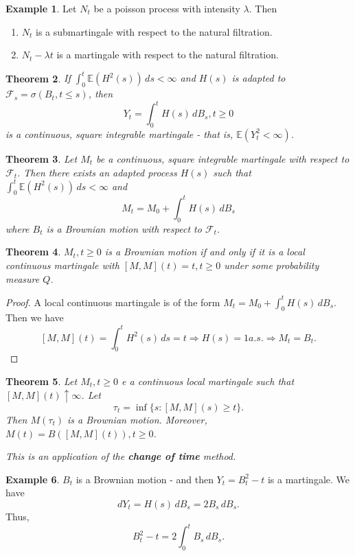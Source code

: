 \documentclass[10pt, oneside, reqno]{amsart}
\theoremstyle{plain}%
\newtheorem{thm}{Theorem}[section]
\theoremstyle{definition}
\newtheorem{exmp}[thm]{Example}
\theoremstyle{remark}
\newcommand{\E}{\mathbb{E}}
\newcommand{\sigf}{\mathcal{F}}
\begin{document}
\begin{exmp}
    Let $N_t$ be a poisson process with intensity $\lambda$.  Then 
    \begin{enumerate}
        \item $N_t$ is a submartingale with respect to the natural filtration.
        \item $N_t - \lambda t$ is a martingale with respect to the natural filtration.  
    \end{enumerate}
\end{exmp}

\begin{thm}
    If $\int_0^t \E(H^2(s)) \, ds < \infty$ and $H(s)$ is adapted to $\sigf_s = \sigma( B_t, t \leq s)$, then \[ Y_t = \int_0^t H(s) \, dB_s, t \geq 0
    \]  is a continuous, square integrable martingale - that is, $\E(Y_t^2 < \infty)$.
\end{thm}

\begin{thm}
    Let $M_t$ be a continuous, square integrable martingale with respect to $\sigf_t$.  Then there exists an adapted process $H(s)$ such that $\int_0^t \E(H^2(s)) \, ds < \infty$ and \[
        M_t = M_0 + \int_0^t H(s) \, dB_s
    \] where $B_t$ is a Brownian motion with respect to $\sigf_t$.
\end{thm}

\begin{thm}
    $M_t, t \geq 0$ is a Brownian motion if and only if it is a local continuous martingale with $[M, M](t) = t, t \geq 0$ under some probability measure $Q$.
\end{thm}
\begin{proof}
    A local continuous martingale is of the form $M_t = M_0 + \int_0^t H(s) \, dB_s$.  Then we have \[
        [M, M](t) = \int_0^t H^2(s) \, ds = t \Rightarrow H(s) = 1 a.s. \Rightarrow M_t = B_t.
    \]
\end{proof}

\begin{thm}
    Let $M_t, t \geq 0$ e a continuous local martingale such that $[M, M](t) \uparrow \infty$.  Let \[
        \tau_t = \inf \{ s : [M, M](s) \geq t \}.
    \] Then $M(\tau_t)$ is a Brownian motion.  Moreover, $M(t) = B([M, M](t)), t \geq 0$. 
    
    This is an application of the \textbf{change of time} method.
\end{thm}

\begin{exmp}
    $B_t$ is a Brownian motion - and then $Y_t = B_t^2 - t$ is a martingale.  We have \[
        dY_t = H(s) \, dB_s = 2 B_s \, dB_s.  
    \]  Thus, \[
        B_t^2 - t = 2 \int_0^t B_s \, dB_s.
    \]
\end{exmp}
\end{document}
